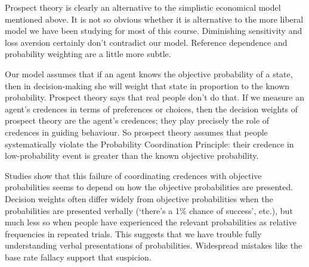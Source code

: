 Prospect theory is clearly an alternative to the simplistic economical
model mentioned above. It is not so obvious whether it is alternative
to the more liberal model we have been studying for most of this
course. Diminishing sensitivity and loss aversion certainly don't
contradict our model. Reference dependence and probability weighting
are a little more subtle.

Our model assumes that if an agent knows the objective probability of
a state, then in decision-making she will weight that state in
proportion to the known probability. Prospect theory says that real
people don't do that. If we measure an agent's credences in terms of
preferences or choices, then the decision weights of prospect theory
are the agent's credences; they play precisely the role of credences
in guiding behaviour. So prospect theory assumes that people
systematically violate the Probability Coordination Principle: their
credence in low-probability event is greater than the known objective
probability.

Studies show that this failure of coordinating credences with
objective probabilities seems to depend on how the objective
probabilities are presented. Decision weights often differ widely from
objective probabilities when the probabilities are presented verbally
(`there's a 1\% chance of success', etc.), but much less so when
people have experienced the relevant probabilities as relative
frequencies in repeated trials.%
This suggests that we have trouble fully understanding verbal
presentations of probabilities. Widespread mistakes like the base rate
fallacy support that suspicion.




